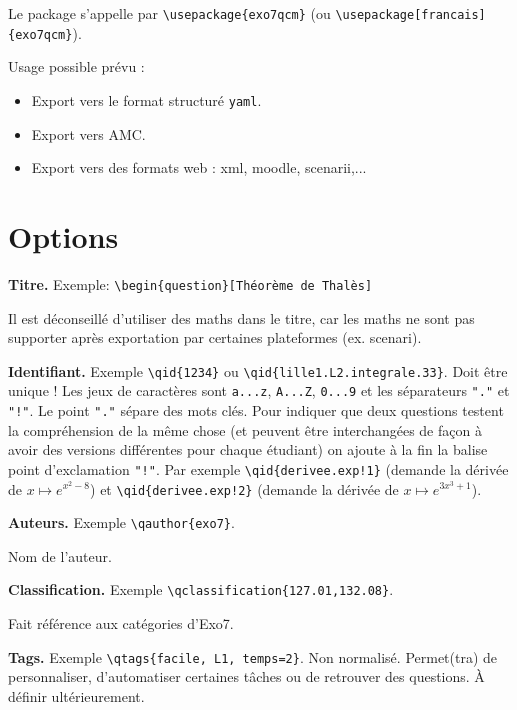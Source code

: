 \documentclass[12pt,a4paper]{article}
\begin{document}
Le package s'appelle par \verb|\usepackage{exo7qcm}| (ou \verb|\usepackage[francais]{exo7qcm}|).

Usage possible prévu  :
\begin{itemize}
  \item Export vers le format structuré \texttt{yaml}.
  \item Export vers AMC.
  \item Export vers des formats web : xml, moodle, scenarii,...
\end{itemize}

\section{Options}

\textbf{Titre.} Exemple: \verb|\begin{question}[Théorème de Thalès]|

Il est déconseillé d'utiliser des maths dans le titre, car les maths ne sont pas supporter après exportation par certaines plateformes (ex. scenari).

\bigskip
\textbf{Identifiant.} Exemple \verb|\qid{1234}| ou \verb|\qid{lille1.L2.integrale.33}|. Doit être unique ! 
Les jeux de caractères sont \texttt{a...z}, \texttt{A...Z}, \texttt{0...9} et les séparateurs \texttt{"."} et \texttt{"!"}. Le point \texttt{"."} sépare des mots clés. 
Pour indiquer que deux questions testent la compréhension de la même chose (et peuvent être interchangées de façon à avoir des versions différentes pour chaque étudiant) on ajoute à la fin la balise point d'exclamation \texttt{"!"}.
Par exemple \verb|\qid{derivee.exp!1}| (demande la dérivée de $x \mapsto e^{x^2-8}$)
et \verb|\qid{derivee.exp!2}| (demande la dérivée de $x \mapsto e^{3x^3+1}$).





\bigskip
\textbf{Auteurs.} Exemple \verb|\qauthor{exo7}|. 

Nom de l'auteur.

\bigskip
\textbf{Classification.} Exemple \verb|\qclassification{127.01,132.08}|. 

Fait référence aux catégories d'Exo7.

\bigskip
\textbf{Tags.} Exemple \verb|\qtags{facile, L1, temps=2}|. Non normalisé. Permet(tra) de personnaliser, d'automatiser certaines tâches ou de retrouver des questions. À définir ultérieurement.
\end{document}
